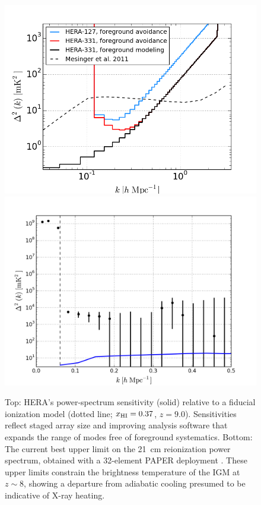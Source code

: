 \documentclass[ars]{copernicus}
\def\HI{{H{\small I }}}
\def\xHI{{x_{\rm\HI}}}
\begin{document}
\begin{figure}[t]\centering
\includegraphics[width=\columnwidth]{plots/eor_pspec_2014.png}
\includegraphics[width=\columnwidth]{plots/hera_pk3pk.png}
\caption{\small Top: HERA's power-spectrum sensitivity (solid)
relative to a fiducial ionization model (dotted line; $\xHI=0.37$, $z=9.0$).  
Sensitivities reflect staged array size and
improving analysis software that expands the range
of modes free of foreground systematics. 
Bottom: The current best upper limit on the 21~cm reionization power spectrum,
obtained with a 32-element PAPER deployment \citep{parsons_et_al2013}.  These upper limits
constrain the brightness temperature of the IGM at $z\sim8$, showing
a departure from adiabatic cooling presumed to be indicative of X-ray heating.
}\label{fig:eor_pspec}
\end{figure}
\end{document}
